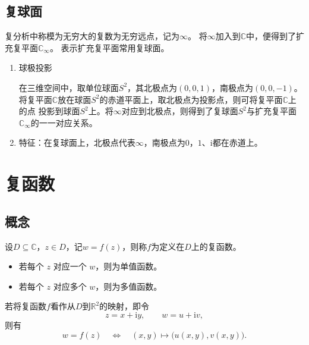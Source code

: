 \documentclass[UTF8,fontset=fandol,zihao=5]{ctexart}
\newcommand{\ii}{\mathrm{i}}
\newcommand{\CC}{\mathbb{C}}
\newcommand{\RR}{\mathbb{R}}
\begin{document}
\subsection{复球面}

复分析中称模为无穷大的复数为无穷远点，记为$\infty$。
将$\infty$加入到$\CC$中，便得到了扩充复平面$\CC_\infty$。
表示扩充复平面常用复球面。

\begin{enumerate}
  \item 球极投影

在三维空间中，取单位球面$S^2$，其北极点为$(0,0,1)$，南极点为$(0,0,-1)$。
将复平面$\CC$放在球面$S^2$的赤道平面上，取北极点为投影点，则可将复平面$\CC$上的点
投影到球面$S^2$上。将$\infty$对应到北极点，则得到了复球面$S^2$与扩充复平面$\CC_\infty$的一一对应关系。

  \item 特征：在复球面上，北极点代表$\infty$，南极点为$0$，$1$、$\ii$都在赤道上。
\end{enumerate}

\section{复函数}

\subsection{概念}

设$D\subseteq\CC$，$z\in D$，记$w=f(z)$，则称$f$为定义在$D$上的复函数。
\begin{itemize}
  \item 若每个 \(z\) 对应一个 \(w\)，则为单值函数。
  \item 若每个 \(z\) 对应多个 \(w\)，则为多值函数。
\end{itemize}

若将复函数$f$看作从$D$到$\RR^2$的映射，即令
\[
  z=x+\ii y,
  \qquad
  w=u+\ii v,
\]
则有
\[
  w=f(z)
  \quad\Longleftrightarrow\quad
  (x,y)\longmapsto\bigl(u(x,y),v(x,y)\bigr).
\]
\end{document}

